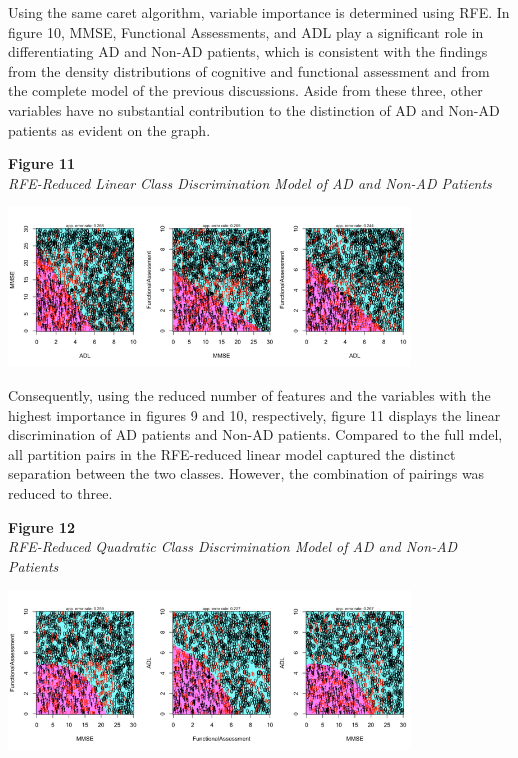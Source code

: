 \documentclass[12pt]{article}
\begin{document}
Using the same caret algorithm, variable importance is determined using RFE. In figure 10, MMSE, Functional Assessments, and ADL play a significant role in differentiating AD and Non-AD patients, which is consistent with the findings from the density distributions of cognitive and functional assessment and from the complete model of the previous 
discussions. Aside from these three, other variables have no substantial contribution to the distinction of AD and Non-AD patients as evident on the graph. 

\noindent
\textbf{Figure 11} \\
\textit{RFE-Reduced Linear Class Discrimination Model of AD and Non-AD Patients}
\begin{center}
    \includegraphics[width = 0.8\textwidth]{LDA_RFE.png}
\end{center}

Consequently, using the reduced number of features and the variables with the highest importance in figures 9 and 10, respectively, figure 11 displays the linear discrimination of AD patients and Non-AD patients. Compared to the full mdel, all partition pairs in the RFE-reduced linear model 
captured the distinct separation between the two classes. However, the combination of pairings was reduced to three. 

\noindent
\textbf{Figure 12} \\ 
\textit{RFE-Reduced Quadratic Class Discrimination Model of AD and Non-AD Patients}
\begin{center}
    \includegraphics[width = 0.8\textwidth]{QDA_RFE.png}
\end{center}
\end{document}
